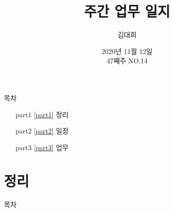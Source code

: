 \documentclass[aspectratio=1610,20pt,xcolor=pdftex,dvipsnames,table,handout]{beamer}
\begin{document}
	

			\title{ 주간 업무 일지 }
			\author{ 김대희 }
			\date{ 2020년 
						11월 
						12일\\ 
						47째주 
						NO.14  }


%
%
%


		\begin{frame}[plain]
		\titlepage
		\end{frame}


		\begin{frame} [plain]{목차}
		\tableofcontents%


			\setlength{\leftmargini}{ 2em}			
			\begin{itemize}

				\item [part1] \ref{part1}	정리
				\item [part2] \ref{part2}	일정
				\item [part3] \ref{part3}	업무

			\end{itemize}


		\end{frame}



		\part{정리 }
		\frame{\partpage}

\label{part1} 	%

		\begin{frame} [plain]{목차}
		\tableofcontents%
		\end{frame}
		

\end{document}

